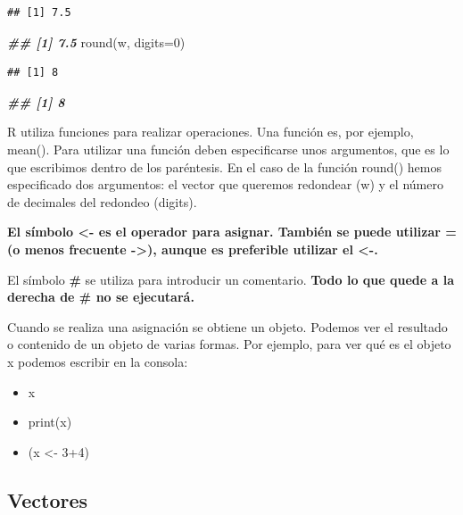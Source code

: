 \documentclass[
]{book}
\newenvironment{Shaded}{\begin{snugshade}}{\end{snugshade}}
\newcommand{\AttributeTok}[1]{\textcolor[rgb]{0.77,0.63,0.00}{#1}}
\newcommand{\DecValTok}[1]{\textcolor[rgb]{0.00,0.00,0.81}{#1}}
\newcommand{\DocumentationTok}[1]{\textcolor[rgb]{0.56,0.35,0.01}{\textbf{\textit{#1}}}}
\newcommand{\FunctionTok}[1]{\textcolor[rgb]{0.00,0.00,0.00}{#1}}
\newcommand{\NormalTok}[1]{#1}
\begin{document}
\begin{verbatim}
## [1] 7.5
\end{verbatim}

\begin{Shaded}
\begin{Highlighting}[]
\DocumentationTok{\#\# [1] 7.5}
\FunctionTok{round}\NormalTok{(w, }\AttributeTok{digits=}\DecValTok{0}\NormalTok{)}
\end{Highlighting}
\end{Shaded}

\begin{verbatim}
## [1] 8
\end{verbatim}

\begin{Shaded}
\begin{Highlighting}[]
\DocumentationTok{\#\# [1] 8}
\end{Highlighting}
\end{Shaded}

R utiliza funciones para realizar operaciones. Una función es, por ejemplo, mean(). Para utilizar una función deben especificarse unos argumentos, que es lo que escribimos dentro de los paréntesis. En el caso de la función round() hemos especificado dos argumentos: el vector que queremos redondear (w) y el número de decimales del redondeo (digits).

\textbf{El símbolo \textless- es el operador para asignar. También se puede utilizar = (o menos frecuente -\textgreater), aunque es preferible utilizar el \textless-.}

El símbolo \textbf{\#} se utiliza para introducir un comentario. \textbf{Todo lo que quede a la derecha de \# no se ejecutará.}

Cuando se realiza una asignación se obtiene un objeto. Podemos ver el resultado o contenido de un objeto de varias formas. Por ejemplo, para ver qué es el objeto x podemos escribir en la consola:

\begin{itemize}
\item
  x
\item
  print(x)
\item
  (x \textless- 3+4)
\end{itemize}

\hypertarget{vectores}{%
\subsection{Vectores}\label{vectores}}
\end{document}
